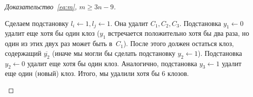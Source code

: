 \begin{proof}[Доказательство~\eqref{eq:m}, $m \ge 3n-9$]
\begin{enumerate}
\begin{enumerate}
\begin{enumerate}
				Сделаем подстановку $l_i \gets 1, l_j \gets 1$. Она удалит $C_1, C_2, C_3$. 
				Подстановка $y_1 \gets 0$ удалит еще хотя бы один клоз
				($y_1$ встречается положительно хотя бы два раза, но один из этих двух раз может быть в~$C_1$).
				После этого должен остаться клоз, содержащий $\overline{y_2}$ (иначе мы могли бы сделать подстановку $y_2 \gets 1$). 
				Подстановка $y_2 \gets 0$ удалит еще хотя бы один клоз. 
				Аналогично, подстановка $y_3 \gets 1$ удалит еще один (новый) клоз. 
				Итого, мы удалили хотя бы $6$ клозов.
			\end{enumerate}
		\end{enumerate}
	\end{enumerate}
\end{proof}